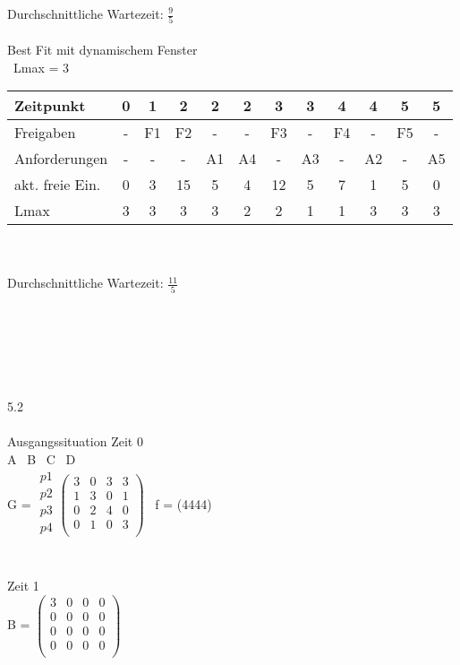 \documentclass[10pt,a4paper]{scrartcl}
\begin{document}
	Durchschnittliche Wartezeit: $\frac{9}{5}$\\\\
	Best Fit mit dynamischem Fenster\\
	\ Lmax = 3\\
	\begin{tabularx}{\textwidth}{p{}|c|c|c|c|c|c|c|c|c|c|c}
		\hline
		Zeitpunkt		& 0	& 1	& 2 & 2 & 2 & 3 & 3 & 4 & 4 & 5 & 5\\
		\hline
		Freigaben		& -	& F1 & F2 & - & - & F3 & - & F4 & - & F5 & -\\
		\hline
		Anforderungen	& -	& -	& - & A1 & A4 & - & A3 & - & A2 & - & A5\\
		\hline
		akt. freie Ein.	& 0	& 3	& 15 & 5 & 4 & 12 & 5 & 7 & 1 & 5 & 0\\
		\hline
		Lmax			& 3	& 3	& 3 & 3 & 2 & 2 & 1 & 1 & 3 & 3 & 3\\
	\end{tabularx}\\\\
	Durchschnittliche Wartezeit: $\frac{11}{5}$\\\\\\\\\\\\\
	\\5.2\\\\
	Ausgangssituation Zeit 0\\
	\noindent\hspace*{19mm} A \ B \ C \ D\\
	G =
	$\begin{array}{r}
	p1 \\
	p2 \\
	p3 \\
	p4 \\
	\end{array}
	\left( \begin{array}{rrrr}
	3 & 0 & 3 & 3 \\
	1 & 3 & 0 & 1 \\
	0 & 2 & 4 & 0 \\
	0 & 1 & 0 & 3 \\
	\end{array}\right) $ 
	\ f = (4444)\\
	\\\\Zeit 1\\
	B =
	$\left( \begin{array}{rrrr}
	3 & 0 & 0 & 0 \\
	0 & 0 & 0 & 0 \\
	0 & 0 & 0 & 0 \\
	0 & 0 & 0 & 0 \\
	\end{array}\right) $
\end{document}
